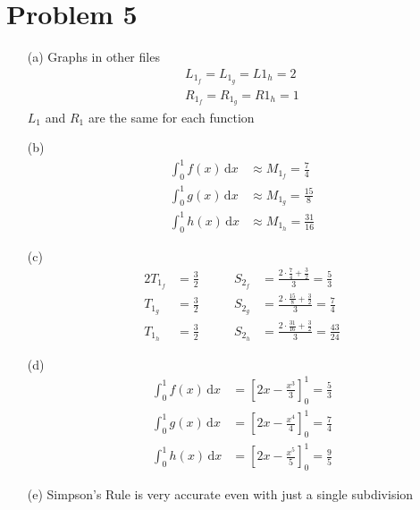 \documentclass[preview, margin=0.6in]{standalone}
\newcommand*{\problem}[1]{\section*{Problem #1}}
\begin{document}
\problem{5}
\begin{itemize}
	\item[(a)]
		Graphs in other files
		\begin{gather*}
			L_{1_f}=L_{1_g}=L{1_h}=2 \\
			R_{1_f}=R_{1_g}=R{1_h}=1
		\end{gather*}
		$L_1$ and $R_1$ are the same for each function

	\item[(b)]
		\begin{align*}
		    \int_{0}^{1}f(x)\,\mathrm{d}x&\approx M_{1_f}=\frac{7}{4} \\
			\int_{0}^{1}g(x)\,\mathrm{d}x&\approx M_{1_g}=\frac{15}{8} \\
			\int_{0}^{1}h(x)\,\mathrm{d}x&\approx M_{1_h}=\frac{31}{16}
		\end{align*}
	\item[(c)]
		\begin{alignat*}{2}
			T_{1_f}&=\frac{3}{2} &\qquad S_{2_f}&=\frac{2\cdot\frac{7}{4}+\frac{3}{2}}{3}=\frac{5}{3} \\
			T_{1_g}&=\frac{3}{2} &\qquad S_{2_g}&=\frac{2\cdot\frac{15}{8}+\frac{3}{2}}{3}=\frac{7}{4} \\
			T_{1_h}&=\frac{3}{2} &\qquad S_{2_h}&=\frac{2\cdot\frac{31}{16}+\frac{3}{2}}{3}=\frac{43}{24} 
		\end{alignat*}
	\item[(d)]
		\begin{align*}
			\int_{0}^{1}f(x)\,\mathrm{d}x&=\left[2x-\frac{x^3}{3}\right]_{0}^{1}=\frac{5}{3} \\
			\int_{0}^{1}g(x)\,\mathrm{d}x&=\left[2x-\frac{x^4}{4}\right]_{0}^{1}=\frac{7}{4} \\
			\int_{0}^{1}h(x)\,\mathrm{d}x&=\left[2x-\frac{x^5}{5}\right]_{0}^{1}=\frac{9}{5}
		\end{align*}
	\item[(e)] Simpson's Rule is very accurate even with just a single subdivision
\end{itemize}
\end{document}
